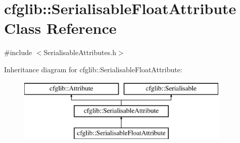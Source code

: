 \hypertarget{classcfglib_1_1SerialisableFloatAttribute}{}\section{cfglib\+:\+:Serialisable\+Float\+Attribute Class Reference}
\label{classcfglib_1_1SerialisableFloatAttribute}


{\ttfamily \#include $<$Serialisable\+Attributes.\+h$>$}

Inheritance diagram for cfglib\+:\+:Serialisable\+Float\+Attribute\+:\begin{figure}[H]
\begin{center}
\leavevmode
\includegraphics[height=3.000000cm]{classcfglib_1_1SerialisableFloatAttribute}
\end{center}
\end{figure}
